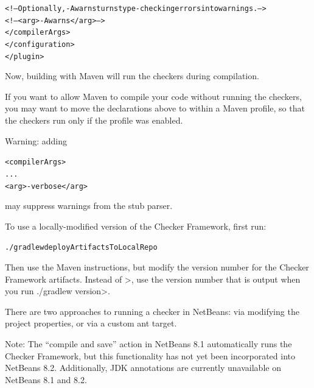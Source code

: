 \begin{enumerate}
\begin{mysmall}
\begin{alltt}
        <!-- Optionally, -Awarns turns type-checking errors into warnings. -->
        <!-- <arg>-Awarns</arg> -->
      </compilerArgs>
    </configuration>
  </plugin>
\end{alltt}
\end{mysmall}

Now, building with Maven will run the checkers during compilation.

If you want to allow Maven to compile your code without running the
checkers, you may want to move the declarations above to within a Maven
profile, so that the checkers run only if the profile was enabled.

Warning:  adding

\begin{mysmall}
\begin{alltt}
<compilerArgs>
  ...
  <arg>-verbose</arg>
\end{alltt}
\end{mysmall}

\noindent
may suppress warnings from the stub parser.

\end{enumerate}



To use a locally-modified version of the Checker Framework, first run:

\begin{alltt}
./gradlew deployArtifactsToLocalRepo
\end{alltt}

\noindent
Then use the Maven instructions, but modify the version number for the
Checker Framework artifacts.  Instead of \<\ReleaseVersion{}>, use the
version number that is output when you run \<./gradlew version>.



There are two approaches to running a checker in NetBeans:  via modifying the
project properties, or via a custom ant target.

Note: The ``compile and save'' action in NetBeans 8.1 automatically
runs the Checker Framework, but this functionality has not yet
been incorporated into NetBeans 8.2. Additionally, JDK annotations
are currently unavailable on NetBeans 8.1 and 8.2.



